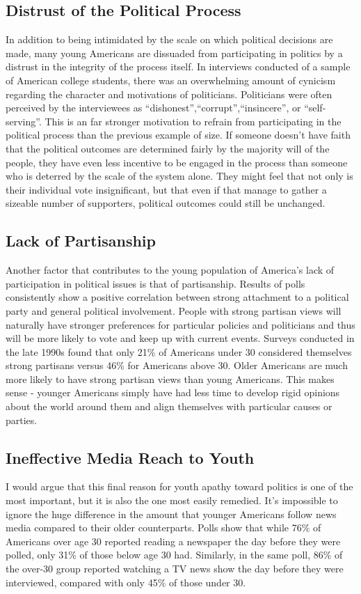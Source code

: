 \documentclass[12pt,letterpaper]{article}
\begin{document}
\subsection{Distrust of the Political Process} In addition to being
intimidated by the scale on which political decisions are made, many
young Americans are dissuaded from participating in politics by a
distrust in the integrity of the process itself. In interviews
conducted of a sample of American college students, there was an
overwhelming amount of cynicism regarding the character and
motivations of politicians.  Politicians were often perceived by the
interviewees as ``dishonest'',``corrupt'',``insincere'', or
``self-serving''.  This is an far stronger motivation to refrain from
participating in the political process than the previous example of
size. If someone doesn't have faith that the political outcomes are
determined fairly by the majority will of the people, they have even
less incentive to be engaged in the process than someone who is
deterred by the scale of the system alone.  They might feel that not
only is their individual vote insignificant, but that even if that
manage to gather a sizeable number of supporters, political outcomes
could still be unchanged. \cite{socia}

\subsection{Lack of Partisanship} Another factor that contributes to
the young population of America's lack of participation in political
issues is that of partisanship.  Results of polls consistently show a
positive correlation between strong attachment to a political party
and general political involvement.  People with strong partisan views
will naturally have stronger preferences for particular policies and
politicians and thus will be more likely to vote and keep up with
current events. Surveys conducted in the late 1990s found that only
21\% of Americans under 30 considered themselves strong partisans
versus 46\% for Americans above 30. Older Americans are much more
likely to have strong partisan views than young Americans.  This makes
sense - younger Americans simply have had less time to develop rigid
opinions about the world around them and align themselves with
particular causes or parties.  \cite{indif}

\subsection{Ineffective Media Reach to Youth} I would argue that this
final reason for youth apathy toward politics is one of the most
important, but it is also the one most easily remedied.  It's
impossible to ignore the huge difference in the amount that younger
Americans follow news media compared to their older counterparts.
Polls show that while 76\% of Americans over age 30 reported reading a
newspaper the day before they were polled, only 31\% of those below
age 30 had. Similarly, in the same poll, 86\% of the over-30 group
reported watching a TV news show the day before they were interviewed,
compared with only 45\% of those under 30.  \cite{pbnews}
\cite{inter}
\end{document}
